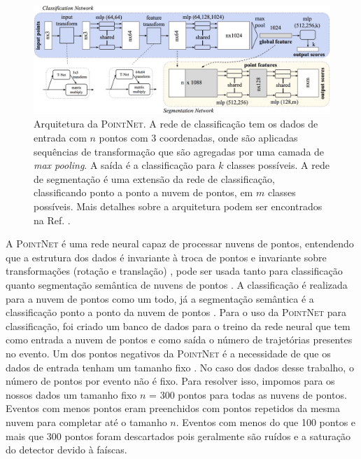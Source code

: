 \documentclass[a4paper,12pt,oneside]{book}
\begin{document}
\begin{figure}[H]
    \centering
    \includegraphics[scale = 0.22]{figs/pointnet_arch.png}
    \caption{Arquitetura da \textsc{PointNet}. A rede de classificação tem os dados de entrada com $n$ pontos com 3 coordenadas, onde são aplicadas sequências de transformação que são agregadas por uma camada de \textit{max pooling}. A saída é a classificação para $k$ classes possíveis. A rede de segmentação é uma extensão da rede de classificação, classificando ponto a ponto a nuvem de pontos, em $m$ classes possíveis. Mais detalhes sobre a arquitetura podem ser encontrados na Ref. \cite{qi2016pointnet}.}
    \label{fig:aqr:pointnet}
\end{figure}

\par A \textsc{PointNet} é uma rede neural capaz de processar nuvens de pontos, entendendo que a estrutura dos dados é invariante à troca de pontos e invariante sobre transformações (rotação e translação) \cite{RF_pc}, pode ser usada tanto para classificação quanto segmentação semântica de nuvens de pontos \cite{qi2016pointnet}. A classificação é realizada para a nuvem de pontos como um todo, já a segmentação semântica é a classificação ponto a ponto da nuvem de pontos \cite{qi2016pointnet}. Para o uso da \textsc{PointNet} para classificação, foi criado um banco de dados para o treino da rede neural que tem como entrada a nuvem de pontos e como saída o número de trajetórias presentes no evento. Um dos pontos negativos da \textsc{PointNet} é a necessidade de que os dados de entrada tenham um tamanho fixo \cite{qi2016pointnet}. No caso dos dados desse trabalho, o número de pontos por evento não é  fixo. Para resolver isso, impomos para os nossos dados um tamanho fixo $n$ = 300 pontos para todas as nuvens de pontos. Eventos com menos pontos eram preenchidos com pontos repetidos da mesma nuvem para completar até o tamanho $n$. Eventos com menos do que 100 pontos e mais que 300 pontos foram descartados pois geralmente são ruídos e a saturação do detector devido à faíscas.
\end{document}
